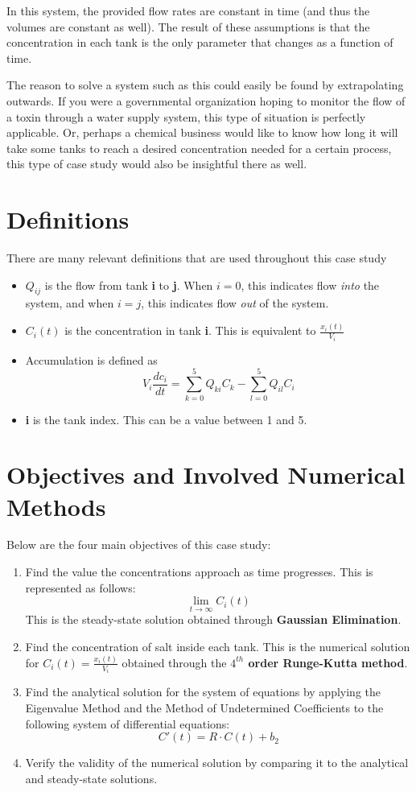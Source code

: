 \documentclass[a4paper, 12pt]{article}
\begin{document}
In this system, the provided flow rates are constant in time (and thus the volumes are constant as well). The result of these assumptions is that the concentration in each tank is the only parameter that changes as a function of time.

The reason to solve a system such as this could easily be found by extrapolating outwards. If you were a governmental organization hoping to monitor the flow of a toxin through a water supply system, this type of situation is perfectly applicable. Or, perhaps a chemical business would like to know how long it will take some tanks to reach a desired concentration needed for a certain process, this type of case study would also be insightful there as well.

\section{Definitions}
There are many relevant definitions that are used throughout this case study
\begin{itemize}
\item $Q_{ij}$ is the flow from tank \textbf{i} to \textbf{j}. When $i=0$, this indicates flow \textit{into} the system, and when $i=j$, this indicates flow \textit{out} of the system.
\item $C_i(t)$ is the concentration in tank \textbf{i}. This is equivalent to $\frac{x_i(t)}{V_i}$
\item Accumulation is defined as
$$V_i\frac{dc_i}{dt}=\sum_{k=0}^{5} Q_{ki}C_k-\sum_{l=0}^{5} Q_{il}C_i$$
\item \textbf{i} is the tank index. This can be a value between 1 and 5.
\end{itemize}

\section{Objectives and Involved Numerical Methods}
Below are the four main objectives of this case study:
\begin{enumerate}
\item Find the value the concentrations approach as time progresses. This is represented as follows:
$$\lim_{t\to\infty}C_i(t)$$
This is the steady-state solution obtained through \textbf{Gaussian Elimination}.
\item Find the concentration of salt inside each tank. This is the numerical solution for $C_i(t)=\frac{x_i(t)}{V_i}$ obtained through the \textbf{$4^{th}$ order Runge-Kutta method}.
\item Find the analytical solution for the system of equations by applying the Eigenvalue Method and the Method of Undetermined Coefficients to the following system of differential equations:
$$C'(t)=R\cdot C(t)+b_2$$
\item Verify the validity of the numerical solution by comparing it to the analytical and steady-state solutions.
\end{enumerate}
\end{document}
